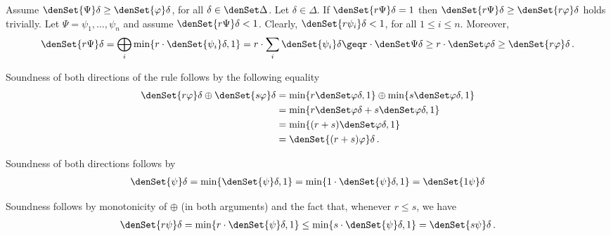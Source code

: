 \documentclass[a4paper,UKenglish,cleveref, autoref, thm-restate]{lipics-v2021}
\begin{document}
\begin{description}[font=\sc,wide]
    \item[Rule (pr):] Assume $\denSet{\Psi}\delta \geq \denSet{\varphi}\delta$, for all $\delta \in \denSet\Delta$.
    Let $\delta \in \Delta$.
    If $\denSet{r\Psi}\delta = 1$ then $\denSet{r\Psi}\delta \geq \denSet{r\varphi}\delta$ holds trivially. Let $\Psi = \psi_1, \dots, \psi_n$ and assume $\denSet{r\Psi}\delta < 1$. Clearly, $\denSet{r\psi_i}\delta < 1$, for all $1\leq i \leq n$. Moreover,
    \begin{align*}
        \denSet{r\Psi}\delta 
        = \bigoplus_i \min\{ r\cdot \denSet{\psi_i}\delta, 1\} 
        = r\cdot \sum_i \denSet{\psi_i}\delta 
        \geq%
        r \cdot \denSet\Psi\delta 
        \geq r \cdot \denSet\varphi\delta 
        \geq %
        \denSet{r\varphi}\delta\,.
    \end{align*}

    \item[Rule (dup):] Soundness of both directions of the rule follows by
    the following equality
    \begin{align*}
        \denSet{r\varphi}\delta \oplus \denSet{s\varphi}\delta 
        &= \min \{ r\denSet\varphi\delta,1\} \oplus \min \{ s\denSet\varphi\delta,1\} \\
        &= \min \{ r\denSet\varphi\delta+s\denSet\varphi\delta,1\} \\
        &= \min \{ (r+s)\denSet\varphi\delta,1\} \\
        &= \denSet{(r+s)\varphi}\delta \,.
    \end{align*}

    \item[Rule (der):] Soundness of both directions follows by
     \begin{align*}
        \denSet{\psi}\delta
        = \min \{ \denSet{\psi}\delta,1\}
        = \min \{ 1 \cdot \denSet{\psi}\delta,1\}
        = \denSet{1\psi}\delta
     \end{align*}

    \item[Rule (inc):] Soundness follows by monotonicity of $\oplus$
    (in both arguments) and the fact that, whenever $r \leq s$, we have
    \begin{align*}
        \denSet{r\psi}\delta
        = \min \{ r \cdot \denSet{\psi}\delta,1\}
        \leq \min \{ s \cdot \denSet{\psi}\delta,1\}
        = \denSet{s\psi}\delta \,.
    \end{align*}


\end{description}
\end{document}
